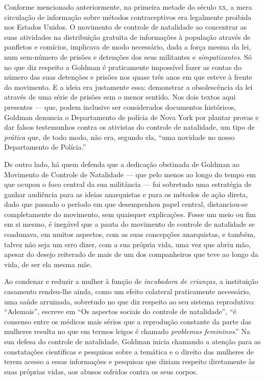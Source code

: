 Conforme mencionado anteriormente, na primeira metade do século \textsc{xx}, a
mera circulação de informação sobre métodos contraceptivos era
legalmente proibida nos Estados Unidos. O movimento de controle de
natalidade ao concentrar as suas atividades na distribuição gratuita de
informações à população através de panfletos e comícios, implicava de
modo necessário, dada a força mesma da lei, num sem-número de prisões e
detenções dos seus militantes e \textit{simpatizantes}. Só no que diz
respeito a Goldman é praticamente impossível fazer as contas do número
das suas detenções e prisões nos quase três anos em que esteve à frente
do movimento. E a ideia era justamente essa: demonstrar a obsolescência
da lei através de uma série de prisões sem o menor sentido. Nos dois
textos aqui presentes --- que, podem inclusive ser considerados
documentos históricos, Goldman denuncia o Departamento de polícia de
Nova York por plantar provas e dar falsos testemunhos contra os
ativistas do controle de natalidade, um tipo de \textit{prática} que, de todo
modo, não era, segundo ela, ``uma novidade no nosso Departamento de
Polícia.'' 

De outro lado, há quem defenda que a dedicação obstinada de
Goldman ao Movimento de Controle de Natalidade --- que pelo menos ao
longo do tempo em que ocupou o foco central da sua militância --- foi
sobretudo uma estratégia de ganhar audiência para as ideias anarquistas
e para os métodos de ação direta, dado que passado o período em que
desempenhou papel central, distanciou-se completamente do movimento, sem
quaisquer explicações. Fosse um meio ou fim em si mesmo, é inegável que
a pauta do movimento de controle de natalidade se coadunava, em muitos
aspectos, com as suas concepções anarquistas, e também, talvez não seja
um erro dizer, com a sua própria vida, uma vez que abriu mão, apesar do
desejo reiterado de mais de um dos companheiros que teve ao longo da
vida, de ser ela mesma mãe.

Ao condenar e reduzir a mulher à função de \textit{incubadora de crianças}, a
instituição casamento rendeu-lhe ainda, como um efeito colateral
praticamente necessário, uma saúde arruinada, sobretudo no que diz
respeito ao seu sistema reprodutivo: ``Ademais'', escreve em ``Os
aspectos sociais do controle de natalidade'', ``é consenso entre os
médicos mais sérios que a reprodução constante da parte das mulheres
resulta no que em termos leigos é chamado \textit{problemas femininos}.'' Na
sua defesa do controle de natalidade, Goldman inicia chamando a atenção
para as constatações científicas e pesquisas sobre a temática e o
direito das mulheres de terem acesso a essas informações e pesquisas que
diziam respeito diretamente às suas próprias vidas, aos abusos sofridos
contra os seus corpos. 

